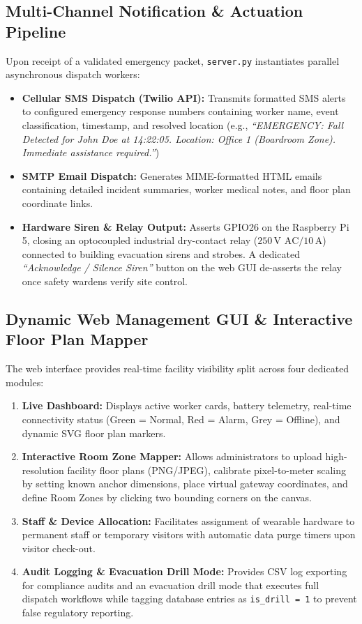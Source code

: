 \subsection{Multi-Channel Notification \& Actuation Pipeline}
Upon receipt of a validated emergency packet, \texttt{server.py} instantiates parallel asynchronous dispatch workers:
\begin{itemize}
    \item \textbf{Cellular SMS Dispatch (Twilio API):} Transmits formatted SMS alerts to configured emergency response numbers containing worker name, event classification, timestamp, and resolved location (e.g., \textit{``EMERGENCY: Fall Detected for John Doe at 14:22:05. Location: Office 1 (Boardroom Zone). Immediate assistance required.''})
    \item \textbf{SMTP Email Dispatch:} Generates MIME-formatted HTML emails containing detailed incident summaries, worker medical notes, and floor plan coordinate links.
    \item \textbf{Hardware Siren \& Relay Output:} Asserts GPIO26 on the Raspberry Pi 5, closing an optocoupled industrial dry-contact relay ($250\,\text{V AC} / 10\,\text{A}$) connected to building evacuation sirens and strobes. A dedicated \textit{``Acknowledge / Silence Siren''} button on the web GUI de-asserts the relay once safety wardens verify site control.
\end{itemize}

\subsection{Dynamic Web Management GUI \& Interactive Floor Plan Mapper}
The web interface provides real-time facility visibility split across four dedicated modules:
\begin{enumerate}
    \item \textbf{Live Dashboard:} Displays active worker cards, battery telemetry, real-time connectivity status (Green = Normal, Red = Alarm, Grey = Offline), and dynamic SVG floor plan markers.
    \item \textbf{Interactive Room Zone Mapper:} Allows administrators to upload high-resolution facility floor plans (PNG/JPEG), calibrate pixel-to-meter scaling by setting known anchor dimensions, place virtual gateway coordinates, and define Room Zones by clicking two bounding corners on the canvas.
    \item \textbf{Staff \& Device Allocation:} Facilitates assignment of wearable hardware to permanent staff or temporary visitors with automatic data purge timers upon visitor check-out.
    \item \textbf{Audit Logging \& Evacuation Drill Mode:} Provides CSV log exporting for compliance audits and an evacuation drill mode that executes full dispatch workflows while tagging database entries as \texttt{is\_drill = 1} to prevent false regulatory reporting.
\end{enumerate}

